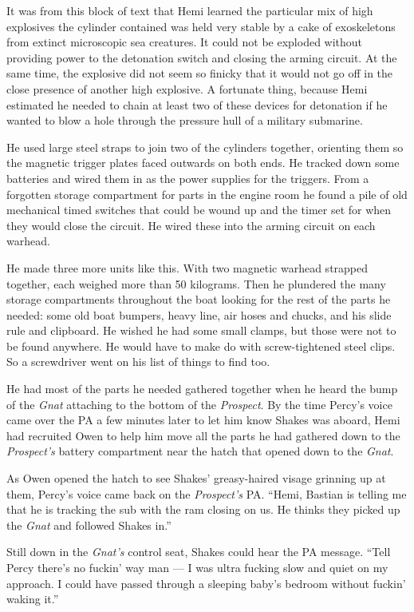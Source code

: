\documentclass[]{scrbook}
\begin{document}
It was from this block of text that Hemi learned the particular mix of
high explosives the cylinder contained was held very stable by a cake of
exoskeletons from extinct microscopic sea creatures. It could not be
exploded without providing power to the detonation switch and closing
the arming circuit. At the same time, the explosive did not seem so
finicky that it would not go off in the close presence of another high
explosive. A fortunate thing, because Hemi estimated he needed to chain
at least two of these devices for detonation if he wanted to blow a hole
through the pressure hull of a military submarine.

He used large steel straps to join two of the cylinders together,
orienting them so the magnetic trigger plates faced outwards on both
ends. He tracked down some batteries and wired them in as the power
supplies for the triggers. From a forgotten storage compartment for
parts in the engine room he found a pile of old mechanical timed
switches that could be wound up and the timer set for when they would
close the circuit. He wired these into the arming circuit on each
warhead.

He made three more units like this. With two magnetic warhead strapped
together, each weighed more than 50 kilograms. Then he plundered the
many storage compartments throughout the boat looking for the rest of
the parts he needed: some old boat bumpers, heavy line, air hoses and
chucks, and his slide rule and clipboard. He wished he had some small
clamps, but those were not to be found anywhere. He would have to make
do with screw-tightened steel clips. So a screwdriver went on his list
of things to find too.

He had most of the parts he needed gathered together when he heard the
bump of the \emph{Gnat} attaching to the bottom of the \emph{Prospect}.
By the time Percy's voice came over the PA a few minutes later to let
him know Shakes was aboard, Hemi had recruited Owen to help him move all
the parts he had gathered down to the \emph{Prospect's} battery
compartment near the hatch that opened down to the \emph{Gnat}.

As Owen opened the hatch to see Shakes' greasy-haired visage grinning up
at them, Percy's voice came back on the \emph{Prospect's} PA. ``Hemi,
Bastian is telling me that he is tracking the sub with the ram closing
on us. He thinks they picked up the \emph{Gnat} and followed Shakes
in.''

Still down in the \emph{Gnat's} control seat, Shakes could hear the PA
message. ``Tell Percy there's no fuckin' way man --- I was ultra fucking
slow and quiet on my approach. I could have passed through a sleeping
baby's bedroom without fuckin' waking it.''
\end{document}
